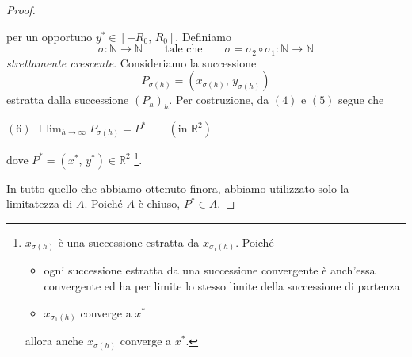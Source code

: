 \begin{proof}
\begin{center}
\end{center}
per un opportuno $y^* \in [-R_0,\,R_0]$. Definiamo
$$
\sigma : \mathbb{N} \longrightarrow \mathbb{N} \qquad \text{tale che} \qquad 
\sigma = \sigma_2 \circ \sigma_1 : \mathbb{N} \longrightarrow \mathbb{N}
$$
\emph{strettamente crescente}. Consideriamo la successione
$$
P_{\sigma(h)} = \left( x_{\sigma(h)},\,y_{\sigma(h)} \right)
$$
estratta dalla successione $(P_h)_h$. Per costruzione, da $\mathrm{(4)}$ e $\mathrm{(5)}$ segue che
\begin{center}
$\mathrm{(6)}$
\hfill
$\displaystyle
\exists \, \lim_{h \rightarrow \infty} P_{\sigma(h)} = P^* \qquad (\text{in } \mathbb{R}^2)
$
\hfill \null \\
\end{center}
dove $P^* = (x^*,\,y^*) \in \mathbb{R}^2$ \footnote
{$x_{\sigma(h)}$ è una successione estratta da $x_{\sigma_1(h)}$. Poiché
\begin{itemize}
\item ogni successione estratta da una successione convergente è anch'essa convergente ed ha per limite lo stesso limite della successione di partenza
\item $x_{\sigma_1(h)}$ converge a $x^*$
\end{itemize}
allora anche $x_{\sigma(h)}$ converge a $x^*$.
}.

In tutto quello che abbiamo ottenuto finora, abbiamo utilizzato solo la limitatezza di $A$. Poiché $A$ è chiuso, $P^* \in A$.
\end{proof}


